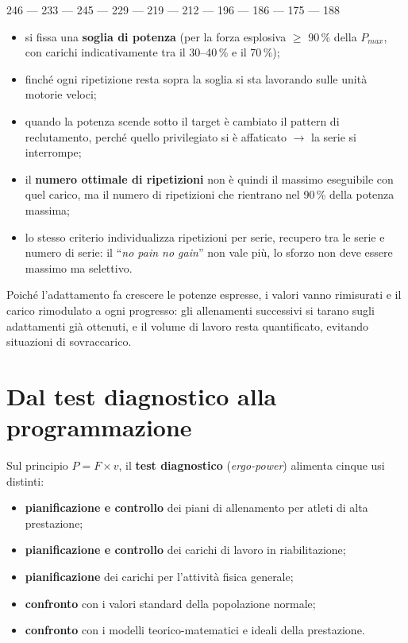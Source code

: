 \begin{center}
246 --- 233 --- 245 --- 229 --- 219 --- 212 --- 196 --- 186 --- 175 --- 188
\end{center}

\begin{itemize}
  \item si fissa una \textbf{soglia di potenza} (per la forza esplosiva $\geq$ 90\,\% della
    $P_{max}$, con carichi indicativamente tra il 30--40\,\% e il 70\,\%);
  \item finché ogni ripetizione resta sopra la soglia si sta lavorando sulle unità motorie veloci;
  \item quando la potenza scende sotto il target è cambiato il pattern di reclutamento, perché
    quello privilegiato si è affaticato $\rightarrow$ la serie si interrompe;
  \item il \textbf{numero ottimale di ripetizioni} non è quindi il massimo eseguibile con quel
    carico, ma il numero di ripetizioni che rientrano nel 90\,\% della potenza massima;
  \item lo stesso criterio individualizza ripetizioni per serie, recupero tra le serie e numero di
    serie: il ``\textit{no pain no gain}'' non vale più, lo sforzo non deve essere massimo ma
    selettivo.
\end{itemize}

Poiché l'adattamento fa crescere le potenze espresse, i valori vanno rimisurati e il carico
rimodulato a ogni progresso: gli allenamenti successivi si tarano sugli adattamenti già ottenuti, e
il volume di lavoro resta quantificato, evitando situazioni di sovraccarico.

\section{Dal test diagnostico alla programmazione}

Sul principio $P = F \times v$, il \textbf{test diagnostico} (\textit{ergo-power}) alimenta cinque
usi distinti:
\begin{itemize}
  \item \textbf{pianificazione e controllo} dei piani di allenamento per atleti di alta prestazione;
  \item \textbf{pianificazione e controllo} dei carichi di lavoro in riabilitazione;
  \item \textbf{pianificazione} dei carichi per l'attività fisica generale;
  \item \textbf{confronto} con i valori standard della popolazione normale;
  \item \textbf{confronto} con i modelli teorico-matematici e ideali della prestazione.
\end{itemize}

